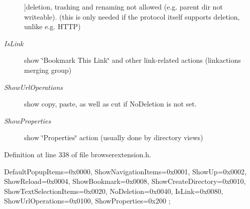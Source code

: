 \begin{Desc}
\begin{description}
{}]deletion, trashing and renaming not allowed (e.\-g. parent dir not writeable). (this is only needed if the protocol itself supports deletion, unlike e.\-g. \-H\-T\-T\-P) \item[{\em 
\hypertarget{classKParts_1_1BrowserExtension_ae5b9acf92e7d83faf5142597371ef1e3a0521ef0fcccfba841ae8c5ae373f8976}{\-Is\-Link}\label{classKParts_1_1BrowserExtension_ae5b9acf92e7d83faf5142597371ef1e3a0521ef0fcccfba841ae8c5ae373f8976}
}]show \char`\"{}\-Bookmark This Link\char`\"{} and other link-\/related actions (linkactions merging group) \item[{\em 
\hypertarget{classKParts_1_1BrowserExtension_ae5b9acf92e7d83faf5142597371ef1e3a40232b7894e5aa48029559354b84aeb5}{\-Show\-Url\-Operations}\label{classKParts_1_1BrowserExtension_ae5b9acf92e7d83faf5142597371ef1e3a40232b7894e5aa48029559354b84aeb5}
}]show copy, paste, as well as cut if \-No\-Deletion is not set. \item[{\em 
\hypertarget{classKParts_1_1BrowserExtension_ae5b9acf92e7d83faf5142597371ef1e3a12a41a796fe0be4f8411259b7a77920d}{\-Show\-Properties}\label{classKParts_1_1BrowserExtension_ae5b9acf92e7d83faf5142597371ef1e3a12a41a796fe0be4f8411259b7a77920d}
}]show \char`\"{}\-Properties\char`\"{} action (usually done by directory views) \end{description}
\end{Desc}



\-Definition at line 338 of file browserextension.\-h.


\begin{DoxyCode}
                 {
      DefaultPopupItems=0x0000, 
      ShowNavigationItems=0x0001, 
      ShowUp=0x0002, 
      ShowReload=0x0004, 
      ShowBookmark=0x0008, 
      ShowCreateDirectory=0x0010, 
      ShowTextSelectionItems=0x0020, 
      NoDeletion=0x0040, 
      IsLink=0x0080, 
      ShowUrlOperations=0x0100, 
      ShowProperties=0x200     
  };
\end{DoxyCode}


